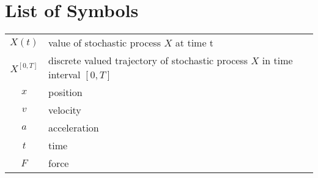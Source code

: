 \chapter*{List of Symbols}

\begin{tabular}{cp{}}
	$ X(t) $ & value of stochastic process $X$ at time t \\
	$ X^{[0, T]} $ & discrete valued trajectory of stochastic process $ X $ in time interval $ [0, T] $ \\
	$x$ & position \\
	$v$ & velocity \\
	$a$ & acceleration \\
	$t$ & time \\
	$F$ & force
\end{tabular}\\
